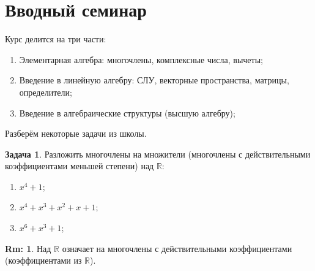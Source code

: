 \documentclass[12pt]{article}
\newcommand{\RN}[1]{%
	\textup{\uppercase\expandafter{\romannumeral#1}}%
}
\newcommand{\MR}{\mathbb{R}}
\theoremstyle{definition}
\newtheorem{rem}{Rm:}
\newtheorem{problem}{Задача}
\begin{document}
\lhead{Алгебра-\RN{1}}
\section*{Вводный семинар}

Курс делится на три части:
\begin{enumerate}[label=\arabic*)]
	\item Элементарная алгебра: многочлены, комплексные числа, вычеты;
	\item Введение в линейную алгебру: СЛУ, векторные пространства, матрицы, определители;
	\item Введение в алгебраические структуры (высшую алгебру);
\end{enumerate}

Разберём некоторые задачи из школы.
\begin{problem}
	Разложить многочлены на множители (многочлены с действительными коэффициентами меньшей степени) над $\MR$:
	\begin{enumerate}[label=\arabic*)]
		\item $x^4 + 1$;
		\item $x^4 + x^3 + x^2 + x + 1$;
		\item $x^6 + x^3 + 1$;
	\end{enumerate}
\end{problem}
\begin{rem}
	Над $\MR$ означает на многочлены с действительными коэффициентами (коэффициентами из $\MR$).
\end{rem}
\end{document}

